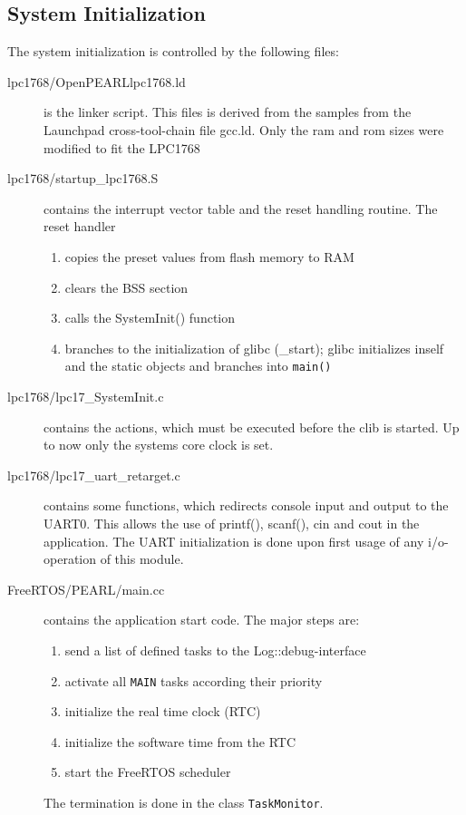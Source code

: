 \subsection{System Initialization}
The system initialization  is controlled by the following files:
\begin{description}
\item[lpc1768/OpenPEARLlpc1768.ld] is the linker script. This files is derived from
   the samples from the Launchpad cross-tool-chain file gcc.ld. 
   Only the ram and rom sizes were modified to fit the LPC1768 
\item[lpc1768/startup\_lpc1768.S] contains the interrupt vector table and the 
   reset handling routine. The reset handler 
   \begin{enumerate}
   \item copies the preset values from flash memory to RAM
   \item clears the BSS section 
   \item  calls the SystemInit() function
   \item  branches to the initialization of glibc (\_start); glibc
      initializes inself and the static objects and branches into \verb|main()|
   \end{enumerate}
\item[lpc1768/lpc17\_SystemInit.c] contains the actions, which must be executed
   before the clib is started. Up to now only the systems core clock is 
   set.
\item [lpc1768/lpc17\_uart\_retarget.c] contains some functions, which redirects console 
   input and output to the UART0.  This allows the use of printf(), 
   scanf(), cin and cout in the application. The UART initialization is done 
   upon first usage of any i/o-operation of this module.
\item[FreeRTOS/PEARL/main.cc] contains the application start code.
 The major steps are:
  \begin{enumerate}
  \item send a list of defined tasks to the Log::debug-interface
  \item activate all \verb|MAIN| tasks according their priority
  \item initialize the real time clock (RTC)
  \item initialize the software time from the RTC
  \item start the FreeRTOS scheduler 
  \end{enumerate}
  The termination is done in the class \verb|TaskMonitor|. 
\end{description}


